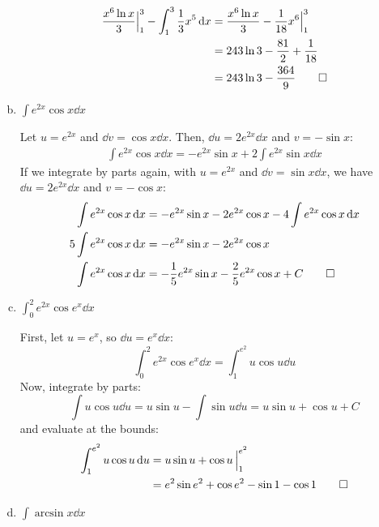 \documentclass{agony}
\begin{document}
\begin{enumerate}[(a)]
\begin{sol}
\begin{align*}
            \frac{x^6\ln x}{3}\Big|_1^3 - \int_1^3 \frac{1}{3}x^5 \dd{x}
             & = \frac{x^6\ln x}{3} - \frac{1}{18} x^6 \Big|_1^3 \\
             & = 243\ln 3 - \frac{81}{2} + \frac{1}{18}          \\
             & = 243\ln 3 - \frac{364}{9} \qedhere
          \end{align*}
        \end{sol}
  \item $\displaystyle\int e^{2x} \cos x \dd{x}$
        \begin{sol}
          Let $u = e^{2x}$ and $\dd{v} = \cos x \dd{x}$.
          Then, $\dd{u} = 2e^{2x} \dd{x}$ and $v = -\sin x$:
          \begin{align*}
            \int e^{2x} \cos x \dd{x} = -e^{2x}\sin x + 2 \int e^{2x}\sin x \dd{x}
          \end{align*}
          If we integrate by parts again,
          with $u = e^{2x}$ and $\dd{v} = \sin x\dd{x}$,
          we have $\dd{u} = 2e^{2x} \dd{x}$ and $v = -\cos x$:
          \begin{align*}
            \int e^{2x} \cos x \dd{x}
             & = -e^{2x}\sin x - 2e^{2x}\cos x - 4 \int e^{2x}\cos x \dd{x}       \\
            5\int e^{2x} \cos x \dd{x}
             & = -e^{2x}\sin x - 2e^{2x}\cos x                                    \\
            \int e^{2x} \cos x \dd{x}
             & = -\frac{1}{5} e^{2x}\sin x - \frac{2}{5}e^{2x}\cos x + C \qedhere
          \end{align*}
        \end{sol}
  \item $\displaystyle\int_0^2 e^{2x} \cos e^x \dd{x}$
        \begin{sol}
          First, let $u = e^x$, so $\dd{u} = e^x \dd{x}$:
          \[ \int_0^2 e^{2x} \cos e^x \dd{x} = \int_1^{e^2} u \cos u \dd{u} \]
          Now, integrate by parts:
          \[ \int u \cos u \dd{u} = u\sin u - \int \sin u \dd{u} = u\sin u + \cos u + C \]
          and evaluate at the bounds:
          \begin{align*}
            \int_1^{e^2} u \cos u \dd{u}
             & = u\sin u + \cos u \,\Big|_1^{e^2}                  \\
             & = e^2\sin e^2 + \cos e^2 - \sin 1 - \cos 1 \qedhere
          \end{align*}
        \end{sol}
  \item $\displaystyle\int \arcsin x \dd{x}$

\end{enumerate}
\end{document}
